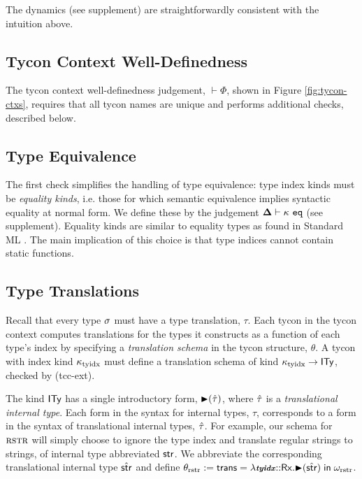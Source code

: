 \documentclass[10pt,preprint]{sigplanconf}
\begin{document}
The dynamics (see supplement) are straightforwardly consistent with the intuition above.%
\subsection{Tycon Context Well-Definedness}
The tycon context well-definedness judgement, $\vdash \Phi$, shown in Figure \ref{fig:tycon-ctxs}, requires that all tycon names are unique and performs additional checks,  described below.

\subsection{Type Equivalence}\label{sec:type-equivalence}
The first check simplifies the handling of type equivalence: type index kinds must be \emph{equality kinds}, i.e. those for which semantic equivalence implies syntactic equality at normal form. We define these by the judgement $\boldsymbol\Delta \vdash \kappa~\mathtt{eq}$ (see supplement). 
Equality kinds are similar to equality types as found in Standard ML \cite{Tofte:89:TheDefinitionOfStandardML}. The main implication of this choice is that type indices cannot contain static functions.


\subsection{Type Translations}\label{sec:type-translations}
Recall that every type $\sigma$ must have a type translation, $\tau$. Each tycon in the tycon context {computes} translations for the types it constructs as a function of each type's index by specifying a \emph{translation schema} in the {tycon structure}, $\theta$. A tycon with index kind $\kappa_\text{tyidx}$ must define a translation schema of kind $\kappa_\text{tyidx} \rightarrow {\sf ITy}$, checked by (tcc-ext). 

The kind ${\sf ITy}$ has a single introductory form, ${\blacktriangleright}(\hat{\tau})$, where $\hat{\tau}$ is a \emph{translational internal type}. Each form in the syntax for internal types, $\tau$,  corresponds to a form in the syntax of translational internal types, $\hat{\tau}$. For example, our schema for $\textsc{rstr}$ will simply choose to ignore the type index and translate regular strings to strings, of internal type abbreviated ${\sf str}$. We abbreviate the corresponding translational internal type $\hat{{\sf str}}$ and define $\small\theta_\text{rstr} := \tcstruct{\slam{\krx}{\svar{tyidx}}{\sqity{\hat{\keyw{str}}}}}{\omega_\text{rstr}}$.
\end{document}
